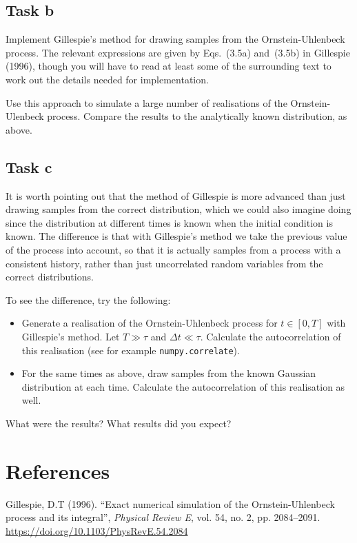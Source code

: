 \documentclass[a4paper]{article}
\begin{document}
\subsection*{Task b}

Implement Gillespie's method for drawing samples from the Ornstein-Uhlenbeck process. The relevant expressions are given by Eqs.~(3.5a) and~(3.5b) in Gillespie (1996), though you will have to read at least some of the surrounding text to work out the details needed for implementation.

Use this approach to simulate a large number of realisations of the Ornstein-Ulenbeck process. Compare the results to the analytically known distribution, as above.


\subsection*{Task c}

It is worth pointing out that the method of Gillespie is more advanced than just drawing samples from the correct distribution, which we could also imagine doing since the distribution at different times is known when the initial condition is known. The difference is that with Gillespie's method we take the previous value of the process into account, so that it is actually samples from a process with a consistent history, rather than just uncorrelated random variables from the correct distributions.


To see the difference, try the following:
\begin{itemize}
    \item Generate a realisation of the Ornstein-Uhlenbeck process for $t\in[0, T]$ with Gillespie's method. Let $T \gg \tau$ and $\Delta t \ll \tau$. Calculate the autocorrelation of this realisation (see for example \texttt{numpy.correlate}).
    \item For the same times as above, draw samples from the known Gaussian distribution at each time. Calculate the autocorrelation of this realisation as well.
\end{itemize}
What were the results? What results did you expect?


\section*{References}

Gillespie, D.T (1996). ``Exact numerical simulation of the Ornstein-Uhlenbeck process and its integral'', \emph{Physical Review E}, vol. 54, no. 2, pp. 2084--2091. \url{https://doi.org/10.1103/PhysRevE.54.2084}
\end{document}
